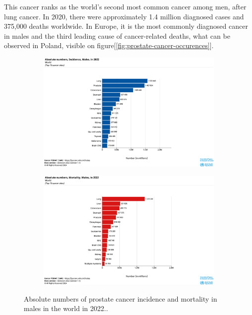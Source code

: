 This cancer ranks as the world's second most common cancer among men, after lung cancer. In 2020, there were approximately 1.4 million diagnosed cases and 375,000 deaths worldwide\cite{culp_recent_2020}.
In Europe, it is the most commonly diagnosed cancer in males and the third leading cause of cancer-related deaths, what can be observed in Poland, visible on figure[\ref{fig:prostate-cancer-occurences}]. 

\begin{figure}[H]
\begin{subfigure}[b]{0.5\textwidth}
    \centering
    \includegraphics[width=1\linewidth]{background/graphic-absolute-numbers-inc-males-in-2022-world.png}
    \label{fig:pc-incidence-world}
\end{subfigure}
\begin{subfigure}[b]{0.5\textwidth}
    \centering
    \includegraphics[width=1\linewidth]{background/graphic-absolute-numbers-mort-males-in-2022-world.png}
    \label{fig:pc-mortality-world}
\end{subfigure}
\caption{Absolute numbers of prostate cancer incidence and mortality in males in the world in 2022.\cite{gco_cancer_today}.}
\end{figure}


